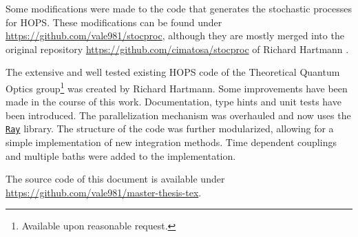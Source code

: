 Some modifications were made to the code that generates the stochastic
processes for HOPS. These modifications can be found under
\url{https://github.com/vale981/stocproc}, although they are mostly
merged into the original repository
\url{https://github.com/cimatosa/stocproc} of Richard Hartmann
.

The extensive and well tested existing HOPS code of the Theoretical
Quantum Optics group\footnote{Available upon reasonable request.} was
created by Richard Hartmann. Some improvements have been made in the
course of this work.  Documentation, type hints and unit tests have
been introduced. The parallelization mechanism was overhauled and now
uses the \href{https://www.ray.io}{\texttt{Ray}} library. The
structure of the code was further modularized, allowing for a simple
implementation of new integration methods. Time dependent couplings
and multiple baths were added to the implementation.

The source code of this document is available under
\url{https://github.com/vale981/master-thesis-tex}.
